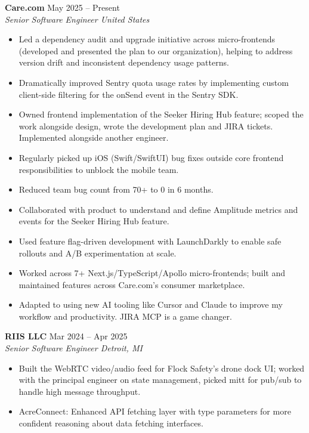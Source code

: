 \documentclass[10pt,letterpaper]{article}
\newcommand{\entry}[4]{%
  {\small\bfseries #1} \hfill {\footnotesize\color{light}#2} \\[-1pt]
  {\footnotesize\itshape #3 \hfill #4} \\[-4pt]
}
\begin{document}
\entry{Care.com}{May 2025 -- Present}{Senior Software Engineer}{United States}
\begin{itemize}[nosep]
  \item {\small Led a dependency audit and upgrade initiative across micro-frontends (developed and presented the plan to our organization), helping to address version drift and inconsistent dependency usage patterns.}
  \item {\small Dramatically improved Sentry quota usage rates by implementing custom client-side filtering for the onSend event in the Sentry SDK.}
  \item {\small Owned frontend implementation of the Seeker Hiring Hub feature; scoped the work alongside design, wrote the development plan and JIRA tickets. Implemented alongside another engineer.}
  \item {\small Regularly picked up iOS (Swift/SwiftUI) bug fixes outside core frontend responsibilities to unblock the mobile team.}
  \item {\small Reduced team bug count from 70+ to 0 in 6 months.}
  \item {\small Collaborated with product to understand and define Amplitude metrics and events for the Seeker Hiring Hub feature.}
  \item {\small Used feature flag-driven development with LaunchDarkly to enable safe rollouts and A/B experimentation at scale.}
  \item {\small Worked across 7+ Next.js/TypeScript/Apollo micro-frontends; built and maintained features across Care.com's consumer marketplace.}
  \item {\small Adapted to using new AI tooling like Cursor and Claude to improve my workflow and productivity. JIRA MCP is a game changer.}
\end{itemize}

\vspace{2pt}
\entry{RIIS LLC}{Mar 2024 -- Apr 2025}{Senior Software Engineer}{Detroit, MI}
\begin{itemize}[nosep]
  \item {\small Built the WebRTC video/audio feed for Flock Safety's drone dock UI; worked with the principal engineer on state management, picked mitt for pub/sub to handle high message throughput.}
  \item {\small AcreConnect: Enhanced API fetching layer with type parameters for more confident reasoning about data fetching interfaces.}
\end{itemize}
\end{document}
